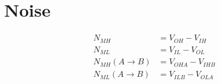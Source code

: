 \section{Noise}
\begin{align}
    N_{MH}                  & = V_{OH} - V_{IH}   \\
    N_{ML}                  & = V_{IL} - V_{OL}   \\
    N_{MH}(A \rightarrow B) & = V_{OHA} - V_{IHB} \\
    N_{ML}(A \rightarrow B) & = V_{ILB} - V_{OLA}
\end{align}